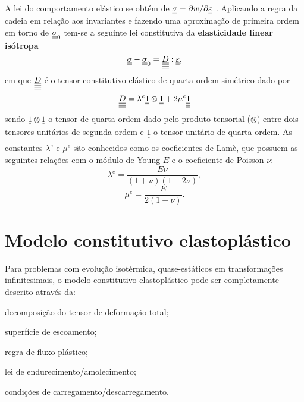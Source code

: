 A lei do comportamento elástico se obtém de $\underline{\underline \sigma} = \partial w / \partial \underline{\underline \varepsilon}$ . Aplicando a regra da cadeia em relação aos invariantes e fazendo uma aproximação de primeira ordem em torno de $\underline{\underline \sigma}_0$ tem-se a seguinte lei constitutiva da \textbf{elasticidade linear isótropa}
\begin{equation}
	\label{eq:lei_elasticidade}
	\underline{\underline \sigma} - \underline{\underline \sigma}_0 = \underline{\underline{\underline{\underline D}}}:\underline{\underline \varepsilon},
\end{equation}
em que $\underline{\underline{\underline{\underline D}}}$ é o tensor constitutivo elástico de quarta ordem simétrico dado por
\begin{equation}
	\label{eq:tensor_constitutivo_elastico}
 	\underline{\underline{\underline{\underline D}}} = \lambda^e \underline{\underline 1} \otimes \underline{\underline 1} + 2 \mu^e \underline{\underline{\underline{\underline 1}}}
\end{equation}
sendo $\underline{\underline 1} \otimes \underline{\underline 1}$ o tensor de quarta ordem dado pelo produto tensorial ($\otimes$) entre dois tensores unitários de segunda ordem e $\underline{\underline{\underline{\underline 1}}}$ o tensor unitário de quarta ordem. As constantes $\lambda^e$ e $\mu^e$ são conhecidos como os coeficientes de Lamè, que possuem as seguintes relações com o módulo de Young $E$ e o coeficiente de Poisson $\nu$:
\begin{equation}
	\label{eq:lambdae}
	\lambda^e = \frac{E \nu}{(1+\nu)(1-2\nu)},
\end{equation}
\begin{equation}
	\label{eq:mue}
	\mu^e = \frac{E}{2(1+\nu)}.
\end{equation}

\section{Modelo constitutivo elastoplástico}

Para problemas com evolução isotérmica, quase-estáticos em transformações infinitesimais, o modelo constitutivo elastoplástico pode ser completamente descrito através da:
\begin{alineas}
	\item decomposição do tensor de deformação total;
	\item superfície de escoamento;
	\item regra de fluxo plástico;
	\item lei de endurecimento/amolecimento;
	\item condições de carregamento/descarregamento.
\end{alineas}

